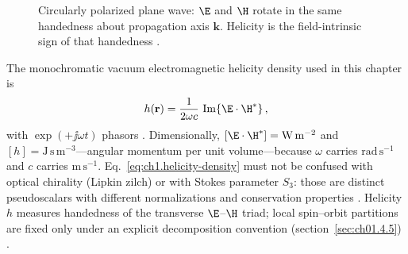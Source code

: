 \begin{figure}[t]
\centering
{}
\caption{Circularly polarized plane wave: $\E$ and $\H$ rotate in the same handedness about propagation axis $\mathbf{k}$. Helicity is the field-intrinsic sign of that handedness \cite{stratton1941,belinfante1940}.}
\label{fig:ch1.helicity-cp-wave}
\end{figure}

The monochromatic vacuum electromagnetic helicity density used in this chapter is
\begin{equation}
\label{eq:ch1.helicity-density}
h(\mathbf{r})=
\frac{1}{2\omega c}\,
\Im\!\left\{\E\cdot\H^*\right\},
\end{equation}
with $\exp(+\jj\omega t)$ phasors \cite{stratton1941,belinfante1940,tai1994}.
Dimensionally, $[\E\cdot\H^*]=\mathrm{W\,m^{-2}}$ and
$[h]=\mathrm{J\,s\,m^{-3}}$---angular momentum per unit volume---because $\omega$ carries $\mathrm{rad\,s^{-1}}$ and $c$ carries $\mathrm{m\,s^{-1}}$.
Eq.~\eqref{eq:ch1.helicity-density} must not be confused with optical chirality (Lipkin
zilch) or with Stokes parameter $S_3$: those are distinct pseudoscalars with different
normalizations and conservation properties \cite{stratton1941,tai1994}. Helicity
$h$ measures handedness of the transverse $\E$--$\H$ triad; local spin--orbit partitions are fixed only under an explicit decomposition convention
(section~\ref{sec:ch01.4.5}) \cite{belinfante1940,stratton1941}.


